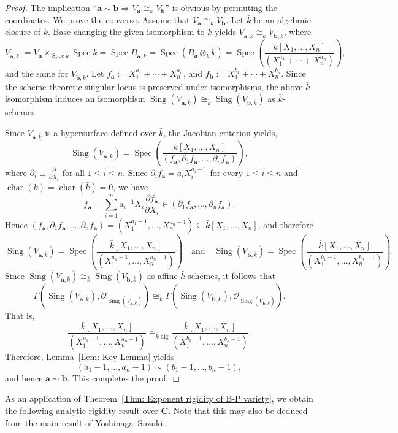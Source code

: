 \documentclass[10pt,a4paper]{amsart}
\numberwithin{equation}{section}
\numberwithin{figure}{section}
\numberwithin{equation}{section}
\newcommand{\C}{\mathbf{C}}
\newcommand{\ba}{\mathbf{a}}
\newcommand{\bb}{\mathbf{b}}
\newcommand{\Spec}{\operatorname{Spec}}
\newcommand{\Sing}{\operatorname{Sing}}
\begin{document}
\begin{proof}
The implication ``$\ba\sim\bb \Rightarrow V_\ba\cong_k V_\bb$'' is obvious by permuting the coordinates. We prove the converse. Assume that $V_\ba\cong_k V_\bb$. Let $\bar{k}$ be an algebraic closure of $k$. Base-changing the given isomorphism to $\bar{k}$ yields $V_{\ba,\bar{k}}\cong_{\bar{k}} V_{\bb,\bar{k}}$, where $$V_{\ba,\bar{k}}:=V_\ba\times_{\Spec k} \Spec \bar{k}=\Spec B_{\ba,\bar{k}}= \Spec(B_\ba\otimes_k \bar{k})=\Spec\!\left(
\frac{\bar{k}[X_1,\ldots,X_n]}
{(X_1^{a_1}+\cdots+X_n^{a_n})}
\right),$$ and the same for $V_{\bb,\bar{k}}$. Let $f_\ba:=X_1^{a_1}+\cdots+X_n^{a_n}$, and $f_\bb:=X_1^{b_1}+\cdots+X_n^{b_n}$. Since the scheme-theoretic singular locus is preserved under isomorphisms, the above $\bar{k}$-isomorphism induces an isomorphism $\Sing(V_{\ba,\bar{k}})\cong_{\bar{k}} \Sing(V_{\bb,\bar{k}})$ as $\bar{k}$-schemes.

Since $V_{\ba, \bar{k}}$ is a hypersurface defined over $\bar{k}$, the Jacobian criterion yields, 
\[
\Sing(V_{\ba,\bar{k}})
=
\Spec\!\left(
\frac{\bar{k}[X_1,\ldots,X_n]}
{(f_\ba,\partial_1f_\ba,\ldots,\partial_nf_\ba)}
\right),
\]
where $\partial_i\equiv\frac{\partial}{\partial X_i}$ for all $1 \le i \le n$. Since $\partial_i f_\ba=a_iX_i^{a_i-1}$ for every $1\le i\le n$
and $\operatorname{char}(k)=\operatorname{char}(\bar{k})=0$, we have
\[
f_\ba
=
\sum_{i=1}^n
{a_i}^{-1}
X_i\frac{\partial f_\ba}{\partial X_i}
\in
(\partial_1f_\ba,\ldots,\partial_nf_\ba).
\]
Hence $(f_\ba,\partial_1f_\ba,\ldots,\partial_nf_\ba)
=
(X_1^{a_1-1},\ldots,X_n^{a_n-1}) \subseteq \bar{k}[X_1,\ldots,X_n]$, and therefore
\[
\Sing(V_{\ba,\bar{k}})
=
\Spec\!\left(
\frac{\bar{k}[X_1,\ldots,X_n]}
{(X_1^{a_1-1},\ldots,X_n^{a_n-1})}
\right) \quad \text{and} \quad \Sing(V_{\bb,\bar{k}})
=
\Spec\!\left(
\frac{\bar{k}[X_1,\ldots,X_n]}
{(X_1^{b_1-1},\ldots,X_n^{b_n-1})}
\right).
\]
Since $\Sing(V_{\ba,\bar{k}})\cong_{\bar{k}}\Sing(V_{\bb,\bar{k}})$ as affine $\bar{k}$-schemes, it follows that
\[
\Gamma(\Sing(V_{\ba,\bar{k}}),\mathcal O_{\Sing(V_{\ba,\bar{k}})})
\cong_{\bar{k}}
\Gamma(\Sing(V_{\bb,\bar{k}}),\mathcal O_{\Sing(V_{\bb,\bar{k}})}).
\]
That is,
\[
\frac{\bar{k}[X_1,\ldots,X_n]}
{(X_1^{a_1-1},\ldots,X_n^{a_n-1})}
\cong_{\bar{k}\text{-alg}}
\frac{\bar{k}[X_1,\ldots,X_n]}
{(X_1^{b_1-1},\ldots,X_n^{b_n-1})}.
\]
Therefore, Lemma~\ref{Lem: Key Lemma} yields
\[
(a_1-1,\ldots,a_n-1)\sim(b_1-1,\ldots,b_n-1),
\]
and hence $\ba\sim\bb$. This completes the proof.
\end{proof}

As an application of Theorem~\ref{Thm: Exponent rigidity of B-P variety}, we obtain the following analytic rigidity result over $\C$. Note that this may also be deduced from the main result of Yoshinaga--Suzuki \cite{YS1978}.
\end{document}
